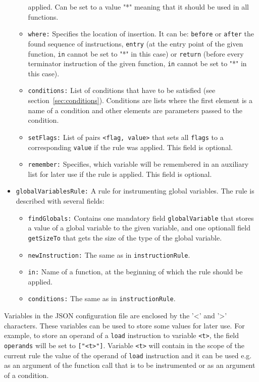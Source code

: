 \begin{itemize}
\begin{itemize}
    applied. Can be set to a value "*" meaning that it should be used in all
    functions.
    \item \texttt{where:} Specifies the location of insertion. It can be:
      \texttt{before} or \texttt{after} the found sequence of instructions,
      \texttt{entry} (at the entry point of the given function, \texttt{in}
      cannot be set to "*" in this case) or \texttt{return} (before every
      terminator instruction of the given function, \texttt{in} cannot be set to
      "*" in this case).
    \item \texttt{conditions:} List of conditions that have to be satisfied
    (see section~\ref{sec:conditions}). Conditions are lists where the first
    element is a name of a condition and other elements are parameters passed
    to the condition.
    \item \texttt{setFlags:} List of pairs \texttt{<flag, value>} that sets
      all \texttt{flags} to a corresponding \texttt{value} if the rule was
      applied. This field is optional.
    \item \texttt{remember:} Specifies, which variable will be remembered in an
    auxiliary list for later use if the rule is applied. This field is optional.

  \end{itemize}
\item \texttt{globalVariablesRule:} A rule for instrumenting global
  variables. The rule is described with several fields:
  \begin{itemize}
    \item \texttt{findGlobals:} Contains one mandatory field
    \texttt{globalVariable} that stores a value of a global variable to the
    given variable, and one optionall field \texttt{getSizeTo} that gets the
    size of the type of the global variable.
    \item \texttt{newInstruction:} The same as in \texttt{instructionRule}.
    \item \texttt{in:} Name of a function, at the beginning of which the rule
    should be applied.
    \item \texttt{conditions:} The same as in \texttt{instructionRule}.

  \end{itemize}

\end{itemize}

Variables in the JSON configuration file are enclosed by the '<' and '>'
characters. These variables can be used to store some values for later use. For
example, to store an operand of a \texttt{load} instruction to variable
\texttt{<t>}, the field \texttt{operands} will be set to \texttt{["<t>"]}.
Variable \texttt{<t>} will contain in the scope of the current rule the value
of the operand of \texttt{load} instruction and it can be used e.g. as an
argument of the function call that is to be instrumented or as an argument of a
condition.

